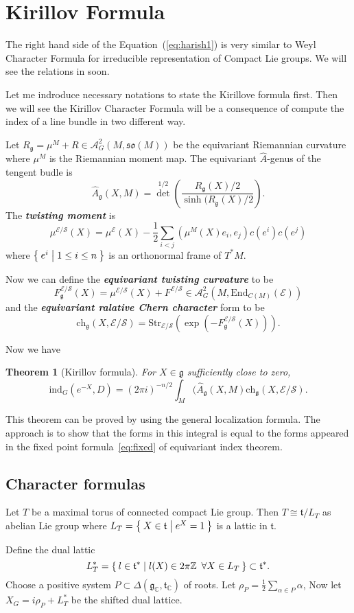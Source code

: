\documentclass[12pt]{amsart}
\newtheorem{Thm}{Theorem}
\def\cA{{\mathcal{A}}}
\def\cE{{\mathcal{E}}}
\def\cS{{\mathcal{S}}}
\def\bC{{\mathbb{C}}}
\def\bZ{{\mathbb{Z}}}
\def\fgg{{\mathfrak{g}}}
\def\ftt{{\mathfrak{t}}}
\def\fso{{\mathfrak{so}}}
\def\bZ{{\mathbb{Z}}}
\def\End{{\mathrm{End}}}
\def\Str{{\mathrm{Str}}}
\def\kw#1{{\bf \em #1}}
\def\ch{\mathrm{ch}}
\def\Ah{{\hat{A}}}
\def\ind{\mathrm{ind}}
\begin{document}
\section{Kirillov Formula}
The right hand side of the Equation~(\ref{eq:harish1}) is very similar to 
Weyl Character Formula for irreducible representation of Compact Lie groups.
We will see the relations in soon. 

Let me indroduce necessary notations to state the Kirillove formula first.
Then we will see the Kirillov Character Formula will be a consequence of 
compute the index of a line bundle in two different way.  

Let $R_\fgg = \mu^M+ R \in \cA^2_G(M,\fso(M))$ be the equivariant Riemannian 
curvature where $\mu^M$ is the Riemannian moment map.
The equivariant $\Ah$-genus of the tengent budle is 
\[
\Ah_\fgg(X,M) = {\det}^{1/2}\left(\frac{R_\fgg(X)/2}{\sinh(R_\fgg(X)/2}\right).
\]
The \kw{twisting moment} is 
\[
\mu^{\cE/\cS}(X) = \mu^\cE(X) - \frac{1}{2}\sum_{i<j}(\mu^M(X)e_i,e_j)c(e^i)c(e^j)
\]
where $\Set{e^i|1\leq i\leq n}$ is an orthonormal frame of $T^*M$.

Now we can define the \kw{equivariant twisting curvature} to be
\[
F_\fgg^{\cE/\cS}(X) = \mu^{\cE/\cS}(X) + F^{\cE/\cS}\in \cA^2_G(M,\End_{C(M)}(\cE))
\]
and the \kw{equivariant ralative Chern character} form to be
\[
\ch_\fgg(X, \cE/\cS) = \Str_{\cE/\cS}(\exp(-F_\fgg^{\cE/\cS}(X))).
\]

Now we have 
\begin{Thm}[Kirillov formula]
For $X\in \fgg$ sufficiently close to zero, 
\[
\ind_G(e^{-X},D)=(2\pi i)^{-n/2}\int_M(\Ah_\fgg(X,M)\ch_\fgg(X,\cE/\cS).
\]
\end{Thm}
This theorem can be proved by using the general localization formula.
The approach is to show that the forms in this integral is equal to the 
forms appeared in the fixed point formula~\ref{eq:fixed} of equivariant index theorem.   

\subsection{Character formulas }
Let $T$ be a maximal torus of connected compact Lie group. 
Then $T\cong \ftt/L_T$ as abelian Lie group 
where $L_T = \Set{X\in \ftt|e^X = 1}$ is a lattic in $\ftt$.

Define the dual lattic 
\[
L_T^* = \Set{l\in \ftt^*|l(X) \in 2\pi \bZ \,\,\, \forall X \in L_T}
\subset \ftt^*.
\]
Choose a positive system $P\subset \Delta(\fgg_\bC,\ftt_\bC)$ of roots.
Let $\rho_P = \frac{1}{2}\sum_{\alpha\in P} \alpha$, 
Now let $X_G = i\rho_P + L_T^*$ be the shifted dual lattice.
\end{document}
